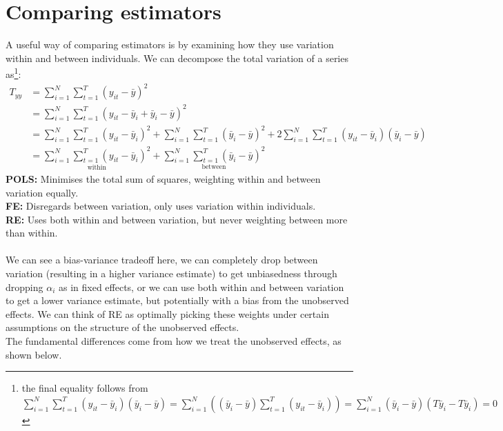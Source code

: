 \documentclass[DIV=14,titlepage=false]{scrreprt}
\begin{document}
\section{Comparing estimators}
A useful way of comparing estimators is by examining how they use variation within and between individuals. We can decompose the total variation of a series as\footnote{ the final equality follows from $ \sum_{i=1}^N \sum_{t=1}^T (y_{it} - \bar{y}_i)(\bar{y}_i - \bar{y}) = \sum_{i=1}^N \left((\bar{y}_i - \bar{y})\sum_{t=1}^T (y_{it} - \bar{y}_i)\right) 
= \sum_{i=1}^N (\bar{y}_i - \bar{y})(T\bar{y}_i - T\bar{y}_i) 
= 0$}:
\begin{align*}
    T_{yy} &= \sum_{i=1}^N \sum_{t=1}^T (y_{it} - \bar{y})^2 \\
    &= \sum_{i=1}^N \sum_{t=1}^T (y_{it} - \bar{y}_i + \bar{y}_i - \bar{y})^2 \\
    &= \sum_{i=1}^N \sum_{t=1}^T (y_{it} - \bar{y}_i)^2 + \sum_{i=1}^N \sum_{t=1}^T (\bar{y}_i - \bar{y})^2 + 2\sum_{i=1}^N \sum_{t=1}^T (y_{it} - \bar{y}_i)(\bar{y}_i - \bar{y}) \\
    &= \underset{\text{within}}{\sum_{i=1}^N \sum_{t=1}^T (y_{it} - \bar{y}_i)^2} + \underset{\text{between}}{\sum_{i=1}^N \sum_{t=1}^T (\bar{y}_i - \bar{y})^2}
\end{align*}
\textbf{POLS:} Minimises the total sum of squares, weighting within and between variation equally.\\
\textbf{FE:} Disregards between variation, only uses variation within individuals.\\
\textbf{RE:} Uses both within and between variation, but never weighting between more than within.\\\\
We can see a bias-variance tradeoff here, we can completely drop between variation (resulting in a higher variance estimate) to get unbiasedness through dropping $\alpha_i$ as in fixed effects, or we can use both within and between variation to get a lower variance estimate, but potentially with a bias from the unobserved effects. We can think of RE as optimally picking these weights under certain assumptions on the structure of the unobserved effects.\\
The fundamental differences come from how we treat the unobserved effects, as shown below.
\end{document}
